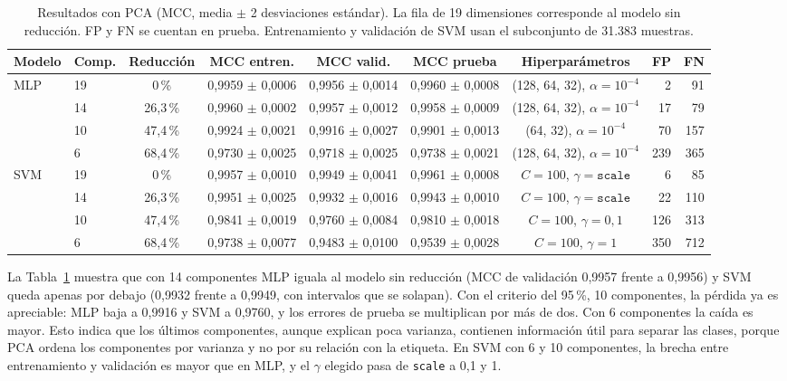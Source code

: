 \documentclass[journal]{IEEEtran}
\begin{document}
\begin{table}[t]
\centering
\caption{Resultados con PCA (MCC, media $\pm$ 2 desviaciones estándar). La fila de 19 dimensiones
corresponde al modelo sin reducción. FP y FN se cuentan en prueba. Entrenamiento y validación de SVM
usan el subconjunto de 31.383 muestras.}
\label{tab:pca}
\small
\begin{tabular}{llcccccrr}
\toprule
\textbf{Modelo} & \textbf{Comp.} & \textbf{Reducción} & \textbf{MCC entren.} & \textbf{MCC valid.} &
\textbf{MCC prueba} & \textbf{Hiperparámetros} & \textbf{FP} & \textbf{FN} \\
\midrule
MLP & 19 & 0\,\% & 0,9959 $\pm$ 0,0006 & 0,9956 $\pm$ 0,0014 & 0,9960 $\pm$ 0,0008 & (128, 64, 32), $\alpha=10^{-4}$ & 2 & 91 \\
    & 14 & 26,3\,\% & 0,9960 $\pm$ 0,0002 & 0,9957 $\pm$ 0,0012 & 0,9958 $\pm$ 0,0009 & (128, 64, 32), $\alpha=10^{-4}$ & 17 & 79 \\
    & 10 & 47,4\,\% & 0,9924 $\pm$ 0,0021 & 0,9916 $\pm$ 0,0027 & 0,9901 $\pm$ 0,0013 & (64, 32), $\alpha=10^{-4}$ & 70 & 157 \\
    & 6 & 68,4\,\% & 0,9730 $\pm$ 0,0025 & 0,9718 $\pm$ 0,0025 & 0,9738 $\pm$ 0,0021 & (128, 64, 32), $\alpha=10^{-4}$ & 239 & 365 \\
\midrule
SVM & 19 & 0\,\% & 0,9957 $\pm$ 0,0010 & 0,9949 $\pm$ 0,0041 & 0,9961 $\pm$ 0,0008 & $C=100$, $\gamma=\texttt{scale}$ & 6 & 85 \\
    & 14 & 26,3\,\% & 0,9951 $\pm$ 0,0025 & 0,9932 $\pm$ 0,0016 & 0,9943 $\pm$ 0,0010 & $C=100$, $\gamma=\texttt{scale}$ & 22 & 110 \\
    & 10 & 47,4\,\% & 0,9841 $\pm$ 0,0019 & 0,9760 $\pm$ 0,0084 & 0,9810 $\pm$ 0,0018 & $C=100$, $\gamma=0{,}1$ & 126 & 313 \\
    & 6 & 68,4\,\% & 0,9738 $\pm$ 0,0077 & 0,9483 $\pm$ 0,0100 & 0,9539 $\pm$ 0,0028 & $C=100$, $\gamma=1$ & 350 & 712 \\
\bottomrule
\end{tabular}
\end{table}

La Tabla~\ref{tab:pca} muestra que con 14 componentes MLP iguala al modelo sin reducción (MCC de
validación 0,9957 frente a 0,9956) y SVM queda apenas por debajo (0,9932 frente a 0,9949, con
intervalos que se solapan). Con el criterio del 95\,\%, 10 componentes, la pérdida ya es apreciable:
MLP baja a 0,9916 y SVM a 0,9760, y los errores de prueba se multiplican por más de dos. Con 6
componentes la caída es mayor. Esto indica que los últimos componentes, aunque explican poca
varianza, contienen información útil para separar las clases, porque PCA ordena los componentes por
varianza y no por su relación con la etiqueta. En SVM con 6 y 10 componentes, la brecha entre
entrenamiento y validación es mayor que en MLP, y el $\gamma$ elegido pasa de \texttt{scale} a
0,1 y 1.
\end{document}
